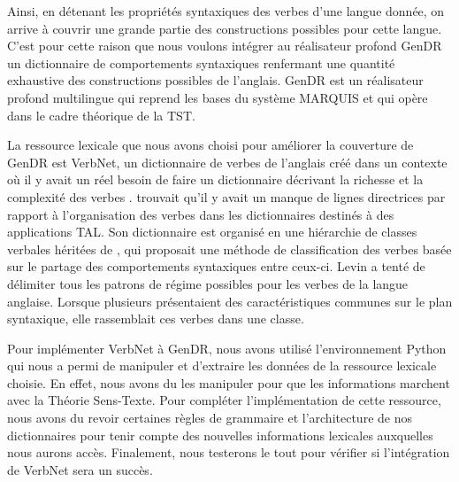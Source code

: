 Ainsi, en détenant les propriétés syntaxiques des verbes d'une langue donnée, on arrive à couvrir une grande partie des constructions possibles pour cette langue. C'est pour cette raison que nous voulons intégrer au réalisateur profond GenDR un dictionnaire de comportements syntaxiques renfermant une quantité exhaustive des constructions possibles de l'anglais. GenDR \citep{lareau18,lambrey15,LambreyGECOv1User2016,LambreyImplementationcollocationspour2017,dubinskaite17} est un réalisateur profond multilingue qui reprend les bases du système MARQUIS et qui opère dans le cadre théorique de la \ac{TST}.

La ressource lexicale que nous avons choisi pour améliorer la couverture de GenDR est VerbNet, un dictionnaire de verbes de l'anglais créé dans un contexte où il y avait un réel besoin de faire un dictionnaire décrivant la richesse et la complexité des verbes \citep{KipperClassBasedConstructionVerb2000}. \cite{SchulerVerbnetBroadcoverageComprehensive2005} trouvait qu'il y avait un manque de lignes directrices par rapport à l'organisation des verbes dans les dictionnaires destinés à des applications \ac{TAL}. Son dictionnaire est organisé en une hiérarchie de classes verbales héritées de \cite{verb-classes.levin.1993}, qui proposait une méthode de classification des verbes basée sur le partage des comportements syntaxiques entre ceux-ci. Levin a tenté de délimiter tous les patrons de régime possibles pour les verbes de la langue anglaise. Lorsque plusieurs présentaient des caractéristiques communes sur le plan syntaxique, elle rassemblait ces verbes dans une classe.

Pour implémenter VerbNet à GenDR, nous avons utilisé l'environnement Python qui nous a permi de manipuler et d'extraire les données de la ressource lexicale choisie. En effet, nous avons du les manipuler pour que les informations marchent avec la Théorie Sens-Texte. Pour compléter l'implémentation de cette ressource, nous avons du revoir certaines règles de grammaire et l'architecture de nos dictionnaires pour tenir compte des nouvelles informations lexicales auxquelles nous aurons accès. Finalement, nous testerons le tout pour vérifier si l'intégration de VerbNet sera un succès.

